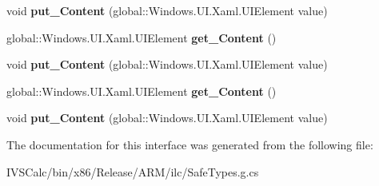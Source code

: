 \begin{DoxyCompactItemize}
\item 
\mbox{\label{interface_windows_1_1_u_i_1_1_xaml_1_1_controls_1_1_i_user_control_adefc31493ff26898833c8bc3a6336ecc}} 
void {\bfseries put\+\_\+\+Content} (global\+::\+Windows.\+U\+I.\+Xaml.\+U\+I\+Element value)
\item 
\mbox{\label{interface_windows_1_1_u_i_1_1_xaml_1_1_controls_1_1_i_user_control_a7908cb0005238b247539616e677346e6}} 
global\+::\+Windows.\+U\+I.\+Xaml.\+U\+I\+Element {\bfseries get\+\_\+\+Content} ()
\item 
\mbox{\label{interface_windows_1_1_u_i_1_1_xaml_1_1_controls_1_1_i_user_control_adefc31493ff26898833c8bc3a6336ecc}} 
void {\bfseries put\+\_\+\+Content} (global\+::\+Windows.\+U\+I.\+Xaml.\+U\+I\+Element value)
\item 
\mbox{\label{interface_windows_1_1_u_i_1_1_xaml_1_1_controls_1_1_i_user_control_a7908cb0005238b247539616e677346e6}} 
global\+::\+Windows.\+U\+I.\+Xaml.\+U\+I\+Element {\bfseries get\+\_\+\+Content} ()
\item 
\mbox{\label{interface_windows_1_1_u_i_1_1_xaml_1_1_controls_1_1_i_user_control_adefc31493ff26898833c8bc3a6336ecc}} 
void {\bfseries put\+\_\+\+Content} (global\+::\+Windows.\+U\+I.\+Xaml.\+U\+I\+Element value)
\end{DoxyCompactItemize}


The documentation for this interface was generated from the following file\+:\begin{DoxyCompactItemize}
\item 
I\+V\+S\+Calc/bin/x86/\+Release/\+A\+R\+M/ilc/Safe\+Types.\+g.\+cs\end{DoxyCompactItemize}
